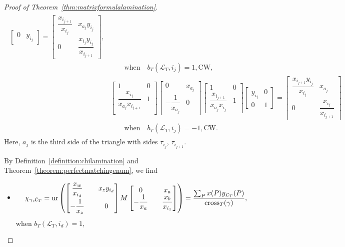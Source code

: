 \documentclass[pdftex]{sigma}
\numberwithin{equation}{section}
\theoremstyle{definition}
\begin{document}
\begin{proof}[Proof of Theorem~\ref{thm:matrixformulalamination}]
{\begin{gather*}
\begin{split}
\begin{bmatrix}
 0 & y_{i_j}
 \end{bmatrix}=
 \begin{bmatrix}
 \dfrac{x_{i_{j+1}}}{x_{i_j}} & x_{a_j}y_{i_j}\\
 0 & \dfrac{x_{i_j}y_{i_j}}{x_{i_{j+1}}}
 \end{bmatrix}, \\
 &\qquad \text{when}\quad b_T(\mathcal{L}_T, i_j)=1, \text{CW},\\
& \begin{bmatrix}
 1 & 0\\
 \dfrac{x_{i_j}}{x_{a_j}x_{i_{j+1}}} & 1\\
 \end{bmatrix}
 \begin{bmatrix}
 0 & x_{a_j}\\
 -\dfrac{1}{x_{a_j}} & 0
 \end{bmatrix}
 \begin{bmatrix}
 1 & 0\\
 \dfrac{x_{i_{j+1}}}{x_{a_j}x_{i_j}} & 1
 \end{bmatrix}
 \begin{bmatrix}
 y_{i_j} & 0\\
 0 & 1
 \end{bmatrix}=
 \begin{bmatrix}
 \dfrac{x_{i_{j+1}}y_{i_j}}{x_{i_j}} & x_{a_j}\\
 0 & \dfrac{x_{i_j}}{x_{i_{j+1}}}
 \end{bmatrix} \\
& \qquad\text{when}\quad b_T(\mathcal{L}_T, i_j)=-1, \text{CW}.
\end{split}
\end{gather*}
Here, $a_j$ is the third side of the triangle with sides $\tau_{i_j}$, $\tau_{i_{j+1}}$.}

By Definition~\ref{definition:chilamination} and Theorem~\ref{theorem:perfectmatchingenum}, we find
 \begin{itemize}\itemsep=0pt
 \item {\samepage\[
 \chi_{\gamma, \mathcal{L}_{T}}=\operatorname{ur}\left(\begin{bmatrix}
\dfrac{x_w}{x_{i_d}} && x_{z}y_{i_d}\vspace{1mm}\\
-\dfrac{1}{x_{z}} && 0
\end{bmatrix}
M
\begin{bmatrix}
0 && x_a\\
-\dfrac{1}{x_a} && \dfrac{x_b}{x_{i_1}}
\end{bmatrix}\right)=\frac{\sum_P x(P)y_{\mathcal{L}_T}(P)}{\operatorname{cross}_T(\gamma)},\]
when $ b_{T}(\mathcal{L}_{T}, i_{d})=1$,}


\end{itemize}
\end{proof}
\end{document}
